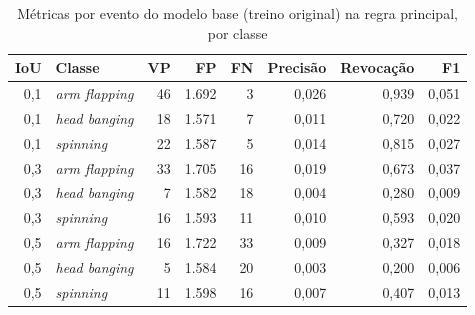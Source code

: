 \begin{table}[htbp]
\centering
\small
\caption{Métricas por evento do modelo base (treino original) na regra principal, por classe}
\label{tab:evento-base-classe}
\begin{tabular}{rlrrrrrr}
\toprule
IoU & Classe & VP & FP & FN & Precisão & Revocação & F1 \\
\midrule
0,1 & \textit{arm flapping} & 46 & 1.692 & 3 & 0,026 & 0,939 & 0,051 \\
0,1 & \textit{head banging} & 18 & 1.571 & 7 & 0,011 & 0,720 & 0,022 \\
0,1 & \textit{spinning} & 22 & 1.587 & 5 & 0,014 & 0,815 & 0,027 \\
\midrule
0,3 & \textit{arm flapping} & 33 & 1.705 & 16 & 0,019 & 0,673 & 0,037 \\
0,3 & \textit{head banging} & 7 & 1.582 & 18 & 0,004 & 0,280 & 0,009 \\
0,3 & \textit{spinning} & 16 & 1.593 & 11 & 0,010 & 0,593 & 0,020 \\
\midrule
0,5 & \textit{arm flapping} & 16 & 1.722 & 33 & 0,009 & 0,327 & 0,018 \\
0,5 & \textit{head banging} & 5 & 1.584 & 20 & 0,003 & 0,200 & 0,006 \\
0,5 & \textit{spinning} & 11 & 1.598 & 16 & 0,007 & 0,407 & 0,013 \\
\bottomrule
\end{tabular}
\end{table}

